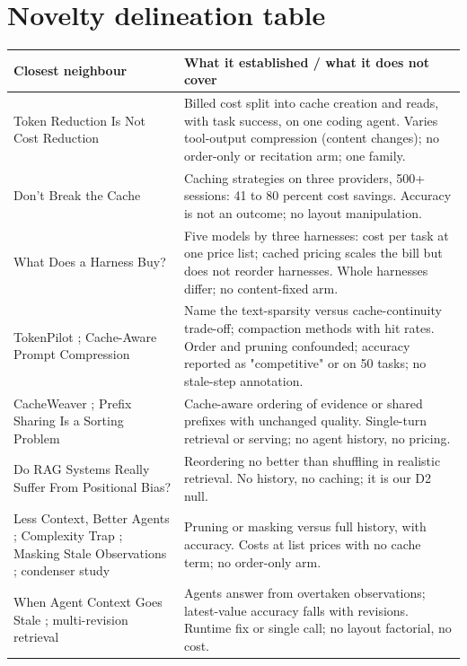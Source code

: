 \section{Novelty delineation table}
\label{app:delineation}
\begin{table}[h]
\small
\centering
\begin{tabular}{p{4.0cm}p{9.2cm}}
\toprule
\textbf{Closest neighbour} & \textbf{What it established / what it does not cover} \\
\midrule
Token Reduction Is Not Cost Reduction \citep{a2607_12161} & Billed cost split into cache creation and reads, with task success, on one coding agent. Varies tool-output compression (content changes); no order-only or recitation arm; one family. \\
Don't Break the Cache \citep{a2601_06007} & Caching strategies on three providers, 500+ sessions: 41 to 80 percent cost savings. Accuracy is not an outcome; no layout manipulation. \\
What Does a Harness Buy? \citep{a2610_04433} & Five models by three harnesses: cost per task at one price list; cached pricing scales the bill but does not reorder harnesses. Whole harnesses differ; no content-fixed arm. \\
TokenPilot \citep{a2606_17016}; Cache-Aware Prompt Compression \citep{a2607_15516} & Name the text-sparsity versus cache-continuity trade-off; compaction methods with hit rates. Order and pruning confounded; accuracy reported as "competitive" or on 50 tasks; no stale-step annotation. \\
CacheWeaver \citep{a2606_19667}; Prefix Sharing Is a Sorting Problem \citep{a2609_13692} & Cache-aware ordering of evidence or shared prefixes with unchanged quality. Single-turn retrieval or serving; no agent history, no pricing. \\
Do RAG Systems Really Suffer From Positional Bias? \citep{a2505_15561} & Reordering no better than shuffling in realistic retrieval. No history, no caching; it is our D2 null. \\
Less Context, Better Agents \citep{a2606_10209}; Complexity Trap \citep{a2508_21433}; Masking Stale Observations \citep{a2606_00408}; condenser study \citep{a2605_18854} & Pruning or masking versus full history, with accuracy. Costs at list prices with no cache term; no order-only arm. \\
When Agent Context Goes Stale \citep{a2610_05281}; multi-revision retrieval \citep{a2603_12271} & Agents answer from overtaken observations; latest-value accuracy falls with revisions. Runtime fix or single call; no layout factorial, no cost. \\

\end{tabular}
\end{table}
